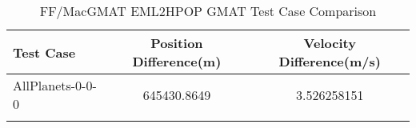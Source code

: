 \begin{table}[htbp!]
\centering
\caption{ FF/MacGMAT EML2HPOP GMAT Test Case Comparison}
      \begin{tabular}{lcc}
      \hline\hline
          Test Case & Position Difference(m) & Velocity Difference(m/s) \\
         \hline
         AllPlanets-0-0-0 & 645430.8649 & 3.526258151 \\
      \hline\hline
      \label{Table: EML2HPOP GMAT Table} 
\end{tabular}
\end{table}
